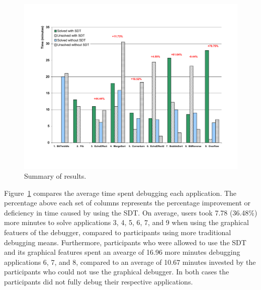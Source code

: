 \documentclass[11pt, letterpaper, onecolumn]{article}
\begin{document}
\begin{figure}[t]
\begin{center}
  \includegraphics[scale=.5, angle=0]{./times-results.pdf}
  \caption{Summary of results.}
  \label{fig:times}
\end{center}
\end{figure}

Figure~\ref{fig:times} compares the  average time spent debugging each
application. The  percentage above each set of  columns represents the
percentage improvement or deficiency in  time caused by using the SDT.
On  average,   users  took  7.78  (36.48\%)  more   minutes  to  solve
applications 3, 4, 5, 6, 7, and 9 when using the graphical featuers of
the  debugger,   compared  to  participants   using  more  traditional
debugging means. Furthermore, participants who were allowed to use the
SDT and its graphical features  spent an avearge of 16.96 more minutes
debugging applications  6, 7,  and 8, compared  to an average  of 10.67
minutes invested by  the participants who could not  use the graphical
debugger. In  both cases  the participants did  not fully  debug their
respective applications.
\end{document}
